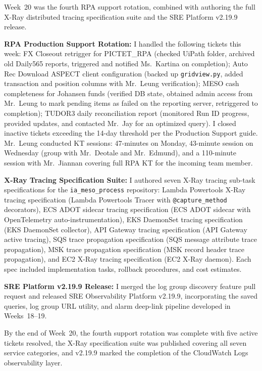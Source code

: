 Week~20 was the fourth RPA support rotation, combined with authoring the
full X-Ray distributed tracing specification suite and the SRE Platform
v2.19.9
release.

\textbf{RPA Production Support Rotation:} 
I handled the following tickets this week: FX Closeout retrigger for
PICTET\_RPA (checked UiPath folder, archived old Daily565 reports, triggered
and notified Ms.\ Kartina on completion); Auto Rec Download ASPECT
client configuration (backed up \texttt{gridview.py}, added transaction and
position columns with Mr.\ Leung verification); MESO cash
completeness for Johansen funds (verified DB state, obtained admin access
from Mr.\ Leung to mark pending items as failed on the reporting server, retriggered to completion);
TUDOR3 daily reconciliation report (monitored Run ID progress,
provided updates, and contacted Mr.\ Jay for an optimized query). I closed inactive tickets
exceeding the 14-day threshold per the Production
Support guide. Mr.\ Leung conducted KT sessions: 47-minutes on Monday,
43-minute session on Wednesday (group with Mr.\ Deotale and Mr.\ Edmund), and a
110-minute session with Mr.\ Jiannan covering full RPA KT for the incoming
team member.

\textbf{X-Ray Tracing Specification Suite:} 
I authored seven X-Ray tracing sub-task specifications for the
\texttt{ia\_meso\_process} repository: Lambda Powertools X-Ray tracing specification (Lambda Powertools Tracer with \texttt{@capture\_method}
decorators), ECS ADOT sidecar tracing specification (ECS ADOT sidecar with OpenTelemetry auto-instrumentation),
EKS DaemonSet tracing specification (EKS DaemonSet collector), API Gateway tracing specification (API Gateway active tracing),
SQS trace propagation specification (SQS message attribute trace propagation), MSK trace propagation specification (MSK record
header trace propagation), and EC2 X-Ray tracing specification (EC2 X-Ray daemon). Each spec
included implementation tasks, rollback procedures, and cost estimates.

\textbf{SRE Platform v2.19.9 Release:} 
I merged the log group discovery feature pull request and released SRE Observability Platform v2.19.9,
incorporating the saved queries, log group URL utility, and alarm deep-link
pipeline developed in Weeks~18--19.

By the end of Week~20, the fourth support rotation was complete with five
active tickets resolved, the X-Ray specification suite was published covering
all seven service categories, and v2.19.9 marked the completion of the CloudWatch
Logs observability layer.

